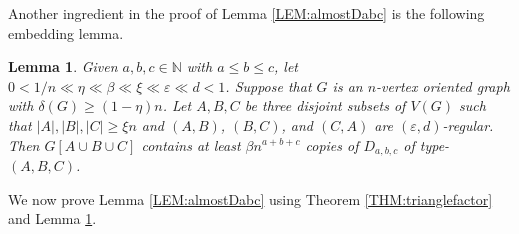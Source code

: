 \documentclass[11pt,a4paper,reqno]{amsart}
\newtheorem{lemma}[theorem]{Lemma}
\theoremstyle{definition} %
\begin{document}
Another ingredient in the proof of Lemma \ref{LEM:almostDabc} is the following embedding lemma.

\begin{lemma}\label{LEM:findmanyDabc}
Given $a,b,c\in \mathbb{N}$ with $a\leqslant b \leqslant c$, let
$0< 1/n\ll \eta \ll \beta \ll \xi \ll \varepsilon \ll d<1$.
Suppose that $G$ is an $n$-vertex oriented graph with $\delta(G)\geqslant (1-\eta )n$.
Let $A,B,C$ be three disjoint subsets of $V(G)$ such that $|A|,|B|,|C| \geqslant \xi n$ and $(A,B)$, $(B,C)$, and $(C,A)$ are $(\varepsilon,d)$-regular.
Then $G[A\cup B\cup C]$ contains at least $\beta n^{a+b+c}$ copies of $D_{a,b,c}$ of type-$(A,B,C)$.
\end{lemma}

We now prove Lemma \ref{LEM:almostDabc} using Theorem \ref{THM:trianglefactor} and Lemma \ref{LEM:findmanyDabc}.
\end{document}
